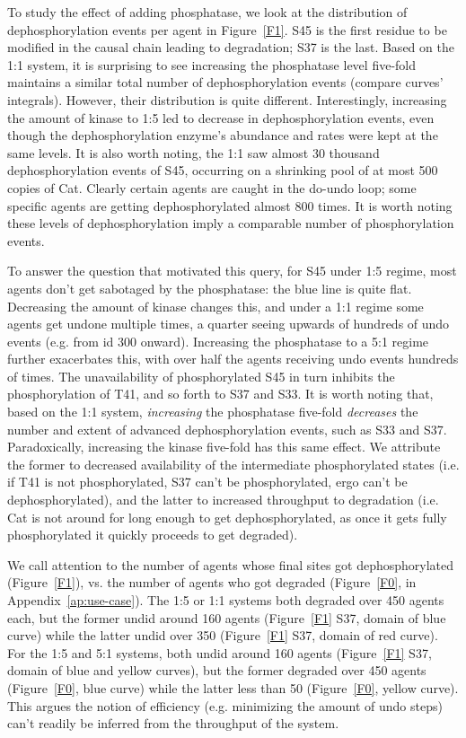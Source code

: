 To study the effect of adding phosphatase, we look at the distribution
of dephosphorylation events per agent in Figure~\ref{F1}. S45 is the
first residue to be modified in the causal chain leading to
degradation; S37 is the last. Based on the 1:1 system, it is surprising
to see increasing the phosphatase level five-fold maintains a similar
total number of dephosphorylation events (compare curves' integrals).
However, their distribution is quite different. Interestingly,
increasing the amount of kinase to 1:5 led to decrease in
dephosphorylation events, even though the dephosphorylation enzyme's
abundance and rates were kept at the same levels. It is also worth
noting, the 1:1 saw almost 30 thousand dephosphorylation events of
S45, occurring on a shrinking pool of at most 500 copies of Cat.
Clearly certain agents are caught in the do-undo loop; some specific
agents are getting dephosphorylated almost 800 times. It is worth
noting these levels of dephosphorylation imply a comparable number of
phosphorylation events.

To answer the question that motivated this query, for S45 under 1:5 regime,
most agents don't get sabotaged by the phosphatase: the blue line is
quite flat. Decreasing the amount of kinase changes this, and
under a 1:1 regime some agents get undone multiple times, a quarter
seeing upwards of hundreds of undo events (e.g. from id 300
onward). Increasing the phosphatase to a 5:1 regime further
exacerbates this, with over half the agents receiving undo events
hundreds of times. The unavailability of phosphorylated S45 in turn
inhibits the phosphorylation of T41, and so forth to S37 and S33. It
is worth noting that, based on the 1:1 system, \emph{increasing} the
phosphatase five-fold \emph{decreases} the number and extent of advanced
dephosphorylation events, such as S33 and S37. Paradoxically,
increasing the kinase five-fold has this same effect. We attribute the
former to decreased availability of the intermediate phosphorylated
states (i.e. if T41 is not phosphorylated, S37 can't be
phosphorylated, ergo can't be dephosphorylated), and the latter to
increased throughput to degradation (i.e. Cat is not around for long
enough to get dephosphorylated, as once it gets fully phosphorylated it
quickly proceeds to get degraded).

We call attention to the number of agents whose final sites got
dephosphorylated (Figure~\ref{F1}), vs. the number of agents who got
degraded (Figure~\ref{F0}, in Appendix~\ref{ap:use-case}). The 1:5 or
1:1 systems both degraded over 450 agents each, but the former undid
around 160 agents (Figure~\ref{F1} S37, domain of blue curve) while
the latter undid over 350 (Figure~\ref{F1} S37, domain of red
curve). For the 1:5 and 5:1 systems, both undid around 160 agents
(Figure~\ref{F1} S37, domain of blue and yellow curves), but the
former degraded over 450 agents (Figure~\ref{F0}, blue curve) while
the latter less than 50 (Figure~\ref{F0}, yellow curve). This argues
the notion of efficiency (e.g. minimizing the amount of undo steps)
can't readily be inferred from the throughput of the system.


